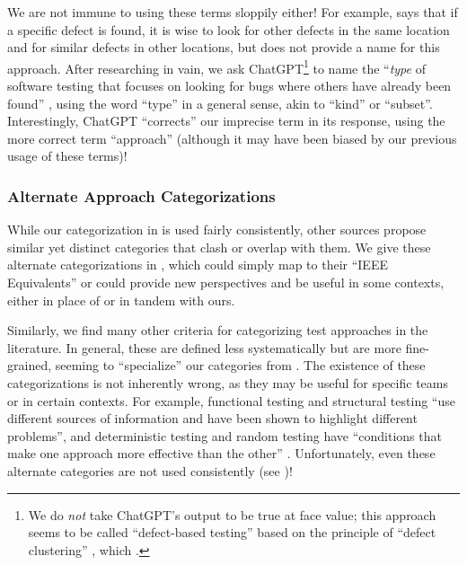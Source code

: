 \label{use-of-chatgpt}
We are not immune to using these terms sloppily either! For example,
\citet[p.~88]{Patton2006} says that if a specific defect is found, it is wise
to look for other defects in the same location and for similar defects in other
locations, but does not provide a name for this approach. After researching in
vain, we ask ChatGPT\footnote{We do \emph{not} take ChatGPT's output to be
    true at face value; this approach seems to be called ``defect-based
    testing'' based on the principle of ``defect clustering''
    \citep{ChatGPT2024}, which \citet{RusEtAl2008} .}
to name the ``\emph{type} of software testing that focuses on looking for bugs
where others have already been found''
\ifnotpaper \citep[emphasis added]{ChatGPT2024}\else \cite{ChatGPT2024}\fi%
,
using the word ``type'' in a general sense, akin to ``kind'' or ``subset''.
Interestingly, ChatGPT ``corrects'' our imprecise term in its response,
using the more correct term ``approach'' (although it may have been biased by
our previous usage of these terms)!

\subsubsection{Alternate Approach Categorizations}\label{alt-cats}

While our categorization in  is used fairly consistently,
other sources \citep[such as][]{SWEBOK2024,BarbosaEtAl2006} propose similar yet
distinct categories that clash or overlap with them. We give these alternate
categorizations in , which could simply map to their
``IEEE Equivalents'' or could provide new perspectives and be useful in some
contexts, either in place of or in tandem with ours.

\afterpage{\begin{landscape}%
        \otherCatsTable{}%
    \end{landscape}}

Similarly, we find many other criteria for categorizing test approaches in
the literature.
In general, these are defined less systematically but are more fine-grained,
seeming to ``specialize'' our categories from . The
existence of these categorizations
is not inherently wrong, as they may be useful for specific teams or in
certain contexts. For example, functional testing and structural testing
``use different sources of information and have been shown to highlight
different problems'', and deterministic testing and random testing have
``conditions that make one approach more effective than the other''
\citep[p.~5\=/16]{SWEBOK2024}. Unfortunately, even these alternate
categories are not used consistently (see )!


